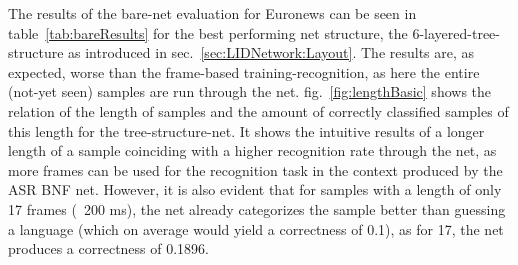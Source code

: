 The results of the bare-net evaluation for Euronews can be seen in table~\ref{tab:bareResults} for the best performing net structure, the 6-layered-tree-structure as introduced in sec.~\ref{sec:LIDNetwork:Layout}. The results are, as expected, worse than the frame-based training-recognition, as here the entire (not-yet seen) samples are run through the net.  fig.~\ref{fig:lengthBasic} shows the relation of the length of samples and the amount of correctly classified samples of this length for the tree-structure-net. It shows the intuitive results of a longer length of a sample coinciding with a higher recognition rate through the net, as more frames can be used for the recognition task in the context produced by the ASR BNF net. However, it is also evident that for samples with a length of only 17 frames (~200 ms), the net already categorizes the sample better than guessing a language (which on average would yield a correctness of 0.1), as for 17, the net produces a correctness of 0.1896.

